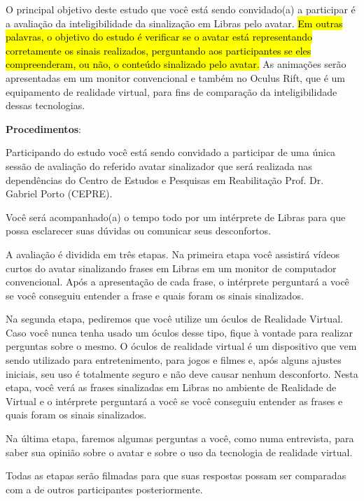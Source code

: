 \documentclass[a4paper, 12pt]{article}
\begin{document}

O principal objetivo deste estudo que você está sendo convidado(a) a participar é a avaliação da inteligibilidade da sinalização em Libras pelo avatar. \hl{Em outras palavras, o objetivo do estudo é verificar se o avatar está representando corretamente os sinais realizados, perguntando aos participantes se eles compreenderam, ou não, o conteúdo sinalizado pelo avatar.}
As animações serão apresentadas em um monitor convencional e também no Oculus Rift, que é um equipamento de realidade virtual, para fins de comparação da inteligibilidade dessas tecnologias.

\vspace{10pt}
\textbf{Procedimentos}:

Participando do estudo você está sendo convidado a participar de uma única sessão de avaliação do referido avatar sinalizador que será realizada nas dependências do Centro de Estudos e Pesquisas em Reabilitação Prof. Dr. Gabriel Porto (CEPRE).

Você será acompanhado(a) o tempo todo por um intérprete de Libras para que possa esclarecer suas dúvidas ou comunicar seus desconfortos.

A avaliação é dividida em três etapas. Na primeira etapa você assistirá vídeos curtos do avatar sinalizando frases em Libras em um monitor de computador convencional. Após a apresentação de cada frase, o intérprete perguntará a você se você conseguiu entender a frase e quais foram os sinais sinalizados.

Na segunda etapa, pediremos que você utilize um óculos de Realidade Virtual. Caso você nunca tenha usado um óculos desse tipo, fique à vontade para realizar perguntas sobre o mesmo. O óculos de realidade virtual é um dispositivo que vem sendo utilizado para entretenimento, para jogos e filmes e, após alguns ajustes iniciais, seu uso é totalmente seguro e não deve causar nenhum desconforto. Nesta etapa, você verá as frases sinalizadas em Libras no ambiente de Realidade de Virtual e o intérprete perguntará a você se você conseguiu entender as frases e quais foram os sinais sinalizados.

Na última etapa, faremos algumas perguntas a você, como numa entrevista, para saber sua opinião sobre o avatar e sobre o uso da tecnologia de realidade virtual.

Todas as etapas serão filmadas para que suas respostas possam ser comparadas com a de outros participantes posteriormente.
\end{document}
